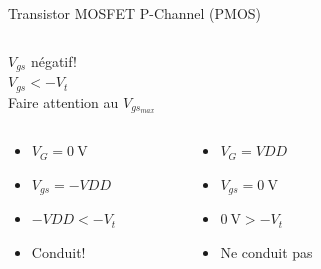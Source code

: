 \begin{frame}{Transistor MOSFET P-Channel (PMOS)}
    \begin{columns}
        \begin{column}{0.75\textwidth}
            \begin{center}
                $V_{gs}$ négatif!\\
                \vspace{6pt}
                $V_{gs} < -V_t$\\
                \vspace{8pt}
                Faire attention au $V_{gs_{max}}$
            \end{center}
            \vspace{24pt}

            \begin{columns}
                \begin{column}{0.5\textwidth}
                    \begin{itemize}
                        \item $V_G = \SI{0}{\volt}$
                        \item $V_{gs} = -VDD$
                        \item $-VDD < -V_t$
                        \item Conduit!
                    \end{itemize}
                \end{column}
                \begin{column}{0.5\textwidth}
                    \begin{itemize}
                        \item $V_G = VDD$
                        \item $V_{gs} = \SI{0}{\volt}$
                        \item $\SI{0}{\volt} > -V_t$
                        \item Ne conduit pas
                    \end{itemize}
                \end{column}
            \end{columns}
        \end{column}

        \begin{column}{0.25\textwidth}
            \begin{center}
            \vspace{-24pt}
\end{center}
\end{column}
\end{columns}
\end{frame}
